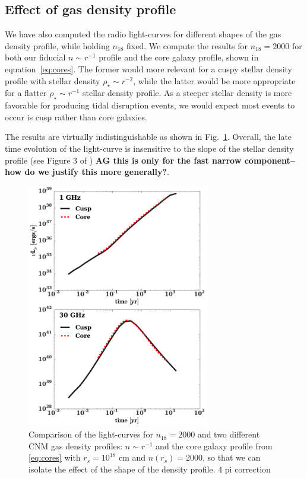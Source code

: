 \documentclass[usenatbib,fleqn]{mnras}
\begin{document}
\subsection{Effect of gas density profile}
\label{sec:profileComp}
We have also computed the radio light-curves for different shapes of
the gas density profile, while holding $n_{18}$ fixed. We compute the
results for $n_{18}=2000$ for both our fiducial $n\sim r^{-1}$ profile and
the core galaxy profile, shown in equation~\eqref{eq:cores}. The
former would more relevant for a cuspy stellar density profile with
stellar density $\rho_{\star}\sim r^{-2}$, while the latter would be more
appropriate for a flatter $\rho_{\star}\sim r^{-1}$ stellar density
profile. As a steeper stellar density is more favorable for producing
tidal disruption events, we would expect most events to occur is cusp
rather than core galaxies.

The results are virtually indistinguishable as shown in
Fig.~\ref{fig:cores}. Overall, the late time evolution of the
light-curve is insensitive to the slope of the stellar density profile
(see Figure 3 of \citealt{Mimica+2015}) {\bf AG this is only for the
  fast narrow component--how do we justify this more generally?}.


\begin{figure} 
  \includegraphics[width=8cm]{fig_cores.pdf}
  \caption{\label{fig:cores} Comparison of the light-curves for
    $n_{18}=2000$ and two different CNM gas density profiles: $n\sim
    r^{-1}$ and the core galaxy profile from \eqref{eq:cores} with
    $r_s=10^{18}$ cm and $n(r_s)=2000$, so that we can isolate the
    effect of the shape of the density profile. 4 pi correction}
\end{figure}
\end{document}
